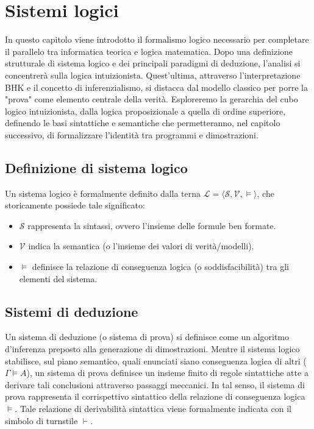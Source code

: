 \chapter{Sistemi logici}
\label{chap:logical_systems}

In questo capitolo viene introdotto il formalismo logico necessario per completare il parallelo tra informatica teorica e logica matematica. Dopo una definizione strutturale 
di sistema logico e dei principali paradigmi di deduzione, l'analisi si concentrerà sulla logica intuizionista. Quest'ultima, attraverso l'interpretazione BHK e il concetto 
di inferenzialismo, si distacca dal modello classico per porre la "prova" come elemento centrale della verità. Esploreremo la gerarchia del cubo logico intuizionista, dalla 
logica proposizionale a quella di ordine superiore, definendo le basi sintattiche e semantiche che permetteranno, nel capitolo successivo, di formalizzare l'identità tra 
programmi e dimostrazioni.

\section{Definizione di sistema logico} 
Un sistema logico è formalmente definito dalla terna $\mathcal{L} = \langle \mathcal{S}, \mathcal{V}, \models \rangle$, che storicamente possiede tale significato:
\begin{itemize}[nosep, leftmargin=1.5em]
    \item $\mathcal{S}$ rappresenta la sintassi, ovvero l'insieme delle formule ben formate.
    \item $\mathcal{V}$ indica la semantica (o l'insieme dei valori di verità/modelli).
    \item $\models$ definisce la relazione di conseguenza logica (o soddisfacibilità) tra gli elementi del sistema.
\end{itemize}


\section{Sistemi di deduzione}
Un sistema di deduzione (o sistema di prova) si definisce come un algoritmo d'inferenza preposto alla generazione di dimostrazioni. Mentre il sistema logico stabilisce, 
sul piano semantico, quali enunciati siano conseguenza logica di altri ($\Gamma \models A$), un sistema di prova definisce un insieme finito di regole sintattiche atte 
a derivare tali conclusioni attraverso passaggi meccanici. In tal senso, il sistema di prova rappresenta il corrispettivo sintattico della relazione di conseguenza logica
$\models$. Tale relazione di derivabilità sintattica viene formalmente indicata con il simbolo di turnstile $\vdash$.

